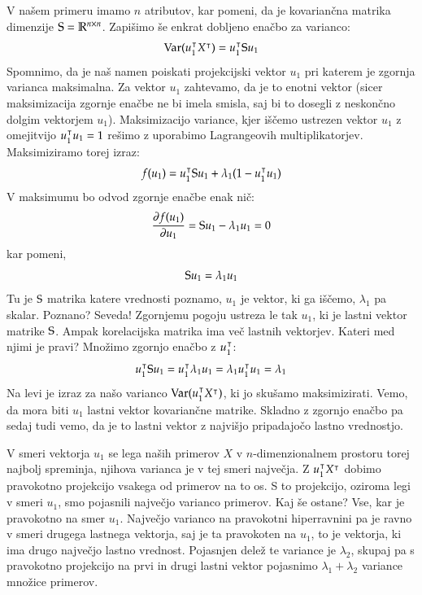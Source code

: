 V našem primeru imamo $n$ atributov, kar pomeni, da je kovariančna matrika dimenzije ${\rm S}=\mathbb{R}^{n\times n}$. Zapišimo še enkrat dobljeno enačbo za varianco:
\begin{equation}
  \mathrm{Var}(u_1^\intercal X^\intercal) = u_1^\intercal {\rm S} u_1
\end{equation}
%
Spomnimo, da je naš namen poiskati projekcijski vektor $u_1$ pri katerem je zgornja varianca maksimalna. Za vektor $u_1$ zahtevamo, da je to enotni vektor (sicer maksimizacija zgornje enačbe ne bi imela smisla, saj bi to dosegli z neskončno dolgim vektorjem $u_1$). Maksimizacijo variance, kjer iščemo ustrezen vektor $u_1$ z omejitvijo $u_1^\intercal u_1=1$ rešimo z uporabimo Lagrangeovih multiplikatorjev. Maksimiziramo torej izraz:
%
\begin{equation}
  f(u_1) = u_1^\intercal {\rm S} u_1 + \lambda_1(1-u_1^\intercal u_1)
\end{equation}
%
V maksimumu bo odvod zgornje enačbe enak nič:
\begin{equation}
  \frac{\partial f(u_1)}{\partial u_1}={\rm S} u_1 - \lambda_1 u_1=0
\end{equation}
%
kar pomeni,
\begin{equation}
  {\rm S} u_1=\lambda_1 u_1
\end{equation}
%
Tu je ${\rm S}$ matrika katere vrednosti poznamo, $u_1$ je vektor, ki ga iščemo, $\lambda_1$ pa skalar. Poznano? Seveda! Zgornjemu pogoju ustreza le tak $u_1$, ki je lastni vektor matrike ${\rm S}$. Ampak korelacijska matrika ima več lastnih vektorjev. Kateri med njimi je pravi? Množimo zgornjo enačbo z $u_1^\intercal$:
%
\begin{equation}
  u_1^\intercal {\rm S} u_1 = u_1^\intercal \lambda_1 u_1=\lambda_1 u_1^\intercal u_1=\lambda_1
\end{equation}
%
Na levi je izraz za našo varianco $\mathrm{Var}(u_1^\intercal X^\intercal)$, ki jo skušamo maksimizirati. Vemo, da mora biti $u_1$ lastni vektor kovariančne matrike. Skladno z zgornjo enačbo pa sedaj tudi vemo, da je to lastni vektor z najvišjo pripadajočo lastno vrednostjo.

V smeri vektorja $u_1$ se lega naših primerov $X$ v $n$-dimenzionalnem prostoru torej najbolj spreminja, njihova varianca je v tej smeri največja. Z $u_1^\intercal X^\intercal$ dobimo pravokotno projekcijo vsakega od primerov na to os. S to projekcijo, oziroma legi v smeri $u_1$, smo pojasnili največjo varianco primerov. Kaj še ostane? Vse, kar je pravokotno na smer $u_1$. Največjo varianco na pravokotni hiperravnini pa je ravno v smeri drugega lastnega vektorja, saj je ta pravokoten na $u_1$, to je vektorja, ki ima drugo največjo lastno vrednost. Pojasnjen delež te variance je $\lambda_2$, skupaj pa s pravokotno projekcijo na prvi in drugi lastni vektor pojasnimo $\lambda_1+\lambda_2$ variance množice primerov.

